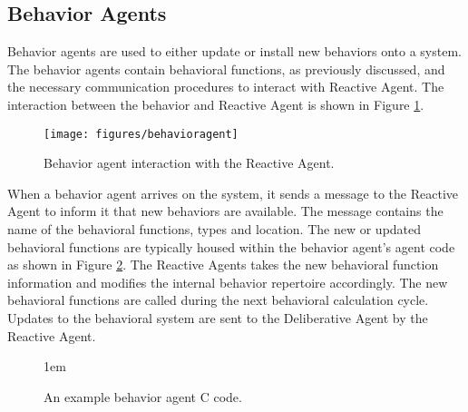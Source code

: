     \subsection{Behavior Agents}
      Behavior agents are used to either update or install new behaviors onto
        a system.
      The behavior agents contain behavioral functions, as previously discussed,
        and the necessary communication procedures to interact with Reactive
        Agent.
      The interaction between the behavior and Reactive Agent is shown in
        Figure \ref{fig:behavioragent}.
      \begin{figure}%
      \centerline{\texttt{[image: figures/behavioragent]}}
      \caption{Behavior agent interaction with the Reactive Agent.}
      \label{fig:behavioragent}
      \end{figure}
      When a behavior agent arrives on the system, it sends a message to the 
        Reactive Agent to inform it that new behaviors are available.
      The message contains the name of the behavioral functions, types and 
        location.
      The new or updated behavioral functions are typically housed within the 
        behavior agent's agent code as shown in Figure \ref{fig:bacode}.
      The Reactive Agents takes the new behavioral function information and
        modifies the internal behavior repertoire accordingly.
      The new behavioral functions are called during the next behavioral
        calculation cycle.
      Updates to the behavioral system are sent to the Deliberative Agent by the 
        Reactive Agent.
      \begin{figure}%
        \begin{center}
        \footnotesize{\baselineskip 1em }
        \end{center}
        \caption{An example behavior agent C code.}
        \label{fig:bacode}
      \end{figure}

